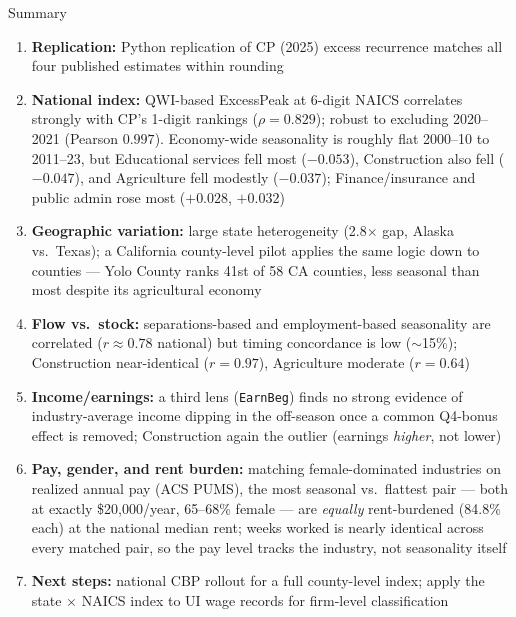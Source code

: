 \documentclass[aspectratio=169]{beamer}
\begin{document}
\begin{frame}{Summary}
  \scriptsize
  \begin{enumerate}
    \item \textbf{Replication:} Python replication of CP (2025) excess recurrence
          matches all four published estimates within rounding
    \smallskip
    \item \textbf{National index:} QWI-based ExcessPeak at 6-digit NAICS correlates
          strongly with CP's 1-digit rankings ($\rho = 0.829$); robust to
          excluding 2020--2021 (Pearson $0.997$). Economy-wide seasonality is
          roughly flat 2000--10 to 2011--23, but Educational services fell
          most ($-0.053$), Construction also fell ($-0.047$), and
          Agriculture fell modestly ($-0.037$); Finance/insurance and public
          admin rose most ($+0.028$, $+0.032$)
    \smallskip
    \item \textbf{Geographic variation:} large state heterogeneity (2.8$\times$
          gap, Alaska vs.\ Texas); a California county-level pilot applies the
          same logic down to counties --- Yolo County ranks 41st of 58 CA
          counties, less seasonal than most despite its agricultural economy
    \smallskip
    \item \textbf{Flow vs.\ stock:} separations-based and employment-based
          seasonality are correlated ($r \approx 0.78$ national) but timing
          concordance is low ($\sim$15\%); Construction near-identical
          ($r=0.97$), Agriculture moderate ($r=0.64$)
    \smallskip
    \item \textbf{Income/earnings:} a third lens (\texttt{EarnBeg}) finds no
          strong evidence of industry-average income dipping in the off-season
          once a common Q4-bonus effect is removed; Construction again the
          outlier (earnings \emph{higher}, not lower)
    \smallskip
    \item \textbf{Pay, gender, and rent burden:} matching female-dominated
          industries on realized annual pay (ACS PUMS), the most seasonal vs.\
          flattest pair --- both at exactly \$20,000/year, 65--68\% female ---
          are \emph{equally} rent-burdened (84.8\% each) at the national
          median rent; weeks worked is nearly identical across every matched
          pair, so the pay level tracks the industry, not seasonality itself
    \smallskip
    \item \textbf{Next steps:} national CBP rollout for a full county-level
          index; apply the state $\times$ NAICS index to UI wage records for
          firm-level classification
  \end{enumerate}
\end{frame}
\end{document}
